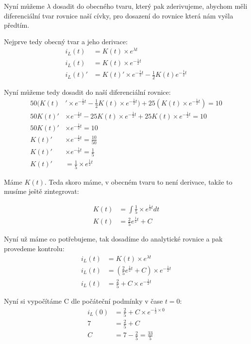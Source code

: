 Nyní můžeme $\lambda$ dosadit do obecného tvaru, který pak zderivujeme, abychom měli diferenciální tvar rovnice naší cívky, pro dosazení do rovnice která nám vyšla předtím.

Nejprve tedy obecný tvar a jeho derivace:
\begin{align*}
	i_L(t) &= K(t)\times e^{\lambda t}\\
	i_L(t) &= K(t)\times e^{-\frac{1}{2}t} \\
	i_L(t)'&= K(t)'\times e^{-\frac{1}{2}t} - \frac{1}{2}K(t)e^{-\frac{1}{2}t}
\end{align*}

Nyní můžeme tedy dosadit do naší diferenciální rovnice:
\begin{align*}
	50(K(t)&'\times e^{-\frac{1}{2}t} - \frac{1}{2}K(t) \times e^{-\frac{1}{2}t}) + 25(K(t)\times e^{-\frac{1}{2}t}) = 10 \\
	50K(t)'&\times e^{-\frac{1}{2}t} - 25K(t)\times e^{-\frac{1}{2}t} + 25K(t)\times e^{-\frac{1}{2}t} = 10 \\
	50K(t)'&\times e^{-\frac{1}{2}t} = 10 \\
	K(t)'&\times e^{-\frac{1}{2}t} = \frac{10}{50} \\
	K(t)'&\times e^{-\frac{1}{2}t} = \frac{1}{5} \\
	K(t)'& = \frac{1}{5}\times e^{\frac{1}{2}t}
\end{align*}

Máme $K(t)$. Teda skoro máme, v obecném tvaru to není derivace, takže to musíme ještě zintegrovat:

\begin{align*}
	K(t) &= \int \frac{1}{5}\times e^{\frac{1}{2}t} dt \\
	K(t) &= \frac{2}{5} e^{\frac{1}{2}t} + C
\end{align*}

Nyní už máme co potřebujeme, tak dosadíme do analytické rovnice a pak provedeme kontrolu:
\begin{align*}
	i_L(t) &= K(t) \times e^{\lambda t} \\
	i_L(t) &= (\frac{2}{5} e^{\frac{1}{2}t} + C) \times e^{-\frac{1}{2} t} \\
	i_L(t) &= \frac{2}{5} + C \times e^{-\frac{1}{2} t}
\end{align*}

Nyní si vypočítáme C dle počáteční podmínky v čase $t = 0$:
\begin{align*}
	i_L(0) &= \frac{2}{5} + C \times e^{-\frac{1}{2} \times 0} \\
	7 &= \frac{2}{5} + C \\
	C &= 7 - \frac{2}{5} = \frac{33}{5}
\end{align*}

